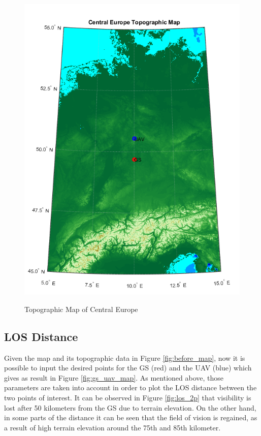\begin{figure}[H]
{  \includegraphics[scale=0.43]{figures/gs_uav_map.png}
  \label{fig:gs_uav_map}}
  \hfill
  \caption{Topographic Map of Central Europe}\label{fig:eu_map}
\end{figure}

\subsection{LOS Distance}
Given the map and its topographic data in Figure \ref{fig:before_map}, now it is possible to input the desired points for the GS (red) and the UAV (blue) which gives as result in Figure \ref{fig:gs_uav_map}. As mentioned above, those parameters are taken into account in order to plot the LOS distance between the two points of interest. It can be observed in Figure \ref{fig:los_2p} that visibility is lost after 50 kilometers from the GS due to terrain elevation. On the other hand, in some parts of the distance it can be seen that the field of vision is regained, as a result of high terrain elevation around the 75th and 85th kilometer.


